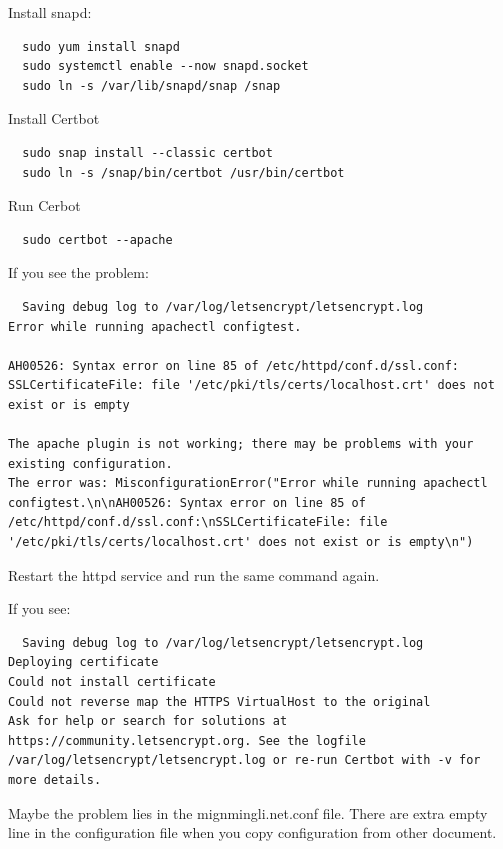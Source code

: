 Install snapd:
\begin{lstlisting}
  sudo yum install snapd
  sudo systemctl enable --now snapd.socket
  sudo ln -s /var/lib/snapd/snap /snap
\end{lstlisting}

Install Certbot
\begin{lstlisting}
  sudo snap install --classic certbot
  sudo ln -s /snap/bin/certbot /usr/bin/certbot
\end{lstlisting}

Run Cerbot
\begin{lstlisting}
  sudo certbot --apache
\end{lstlisting}


If  you see the problem:
\begin{lstlisting}
  Saving debug log to /var/log/letsencrypt/letsencrypt.log
Error while running apachectl configtest.

AH00526: Syntax error on line 85 of /etc/httpd/conf.d/ssl.conf:
SSLCertificateFile: file '/etc/pki/tls/certs/localhost.crt' does not exist or is empty

The apache plugin is not working; there may be problems with your existing configuration.
The error was: MisconfigurationError("Error while running apachectl configtest.\n\nAH00526: Syntax error on line 85 of /etc/httpd/conf.d/ssl.conf:\nSSLCertificateFile: file '/etc/pki/tls/certs/localhost.crt' does not exist or is empty\n")
\end{lstlisting}

Restart the httpd service and run the same command again.


If you see:
\begin{lstlisting}
  Saving debug log to /var/log/letsencrypt/letsencrypt.log
Deploying certificate
Could not install certificate
Could not reverse map the HTTPS VirtualHost to the original
Ask for help or search for solutions at https://community.letsencrypt.org. See the logfile /var/log/letsencrypt/letsencrypt.log or re-run Certbot with -v for more details.
\end{lstlisting}

Maybe the problem lies in the  mignmingli.net.conf file.
There  are extra empty line in the configuration file when you copy configuration from other document.
